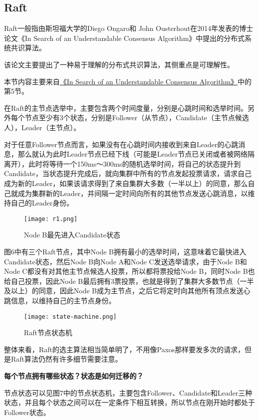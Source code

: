 \documentclass{article}
\begin{document}
\subsection{Raft}

Raft一般指由斯坦福大学的Diego Ongaro和 John Ousterhout在2014年发表的博士论文《In Search of an Understandable Consensus Algorithm》中提出的分布式系统共识算法。

该论文主要提出了一种易于理解的分布式共识算法，其侧重点是可理解性。

本节内容主要来自\href{https://raft.github.io/raft.pdf}{《In Search of an Understandable Consensus Algorithm》}中的第5节。

在Raft的主节点选举中，主要包含两个时间度量，分别是心跳时间和选举时间。另外每个节点至少有3个状态，分别是Follower（从节点），Candidate（主节点候选人），Leader（主节点）。

对于任意Follower节点而言，如果没有在心跳时间内接收到来自Leader的心跳消息，那么就认为此时Leader节点已经下线（可能是Leader节点已关闭或者被网络隔离开），此时将等待一个150ms～300ms的随机选举时间，将自己的状态提升到Candidate，当状态提升完成后，就向集群中所有的节点发起投票请求，请求自己成为新的Leader，如果该请求得到了来自集群大多数（一半以上）的同意，那么自己就成为集群新的Leader，并间隔一定时间向所有的其他节点发送心跳消息，以维持自己的Leader身份。


\begin{figure}[ht]
	\centering
	\texttt{[image: r1.png]}
	\caption{Node B最先进入Candidate状态}
	\label{fig:label}
\end{figure}

图6中有三个Raft节点，其中Node B拥有最小的选举时间，这意味着它最快进入Candidate状态，然后Node B向Node A和Node C发送选举请求，由于Node B和Node C都没有对其他主节点候选人投票，所以都将票投给Node B，同时Node B也给自己投票，因此Node B最后拥有3票投票，也就是得到了集群大多数节点（一半及以上）的同意，因此Node B成为主节点，之后它将定时向其他所有顶点发送心跳信息，以维持自己的主节点身份。

\begin{figure}[ht]
	\centering
	\texttt{[image: state-machine.png]}
	\caption{Raft节点状态机}
	\label{fig:label}
\end{figure}

整体来看，Raft的选主算法相当简单明了，不用像Paxos那样要发多次的请求，但是Raft算法仍然有许多细节需要注意。

\textbf{每个节点拥有哪些状态？状态是如何迁移的？}

节点状态可以见图7中的节点状态机，主要包含Follower、Candidate和Leader三种状态，并且每个状态之间可以在一定条件下相互转换，所以节点在刚开始时都处于Follower状态。
\end{document}
